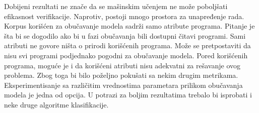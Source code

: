 \documentclass[12pt,oneside]{memoir}
\begin{document}
Dobijeni rezultati ne znače da se mašinskim učenjem ne može poboljšati efikasnost verifikacije. Naprotiv, postoji mnogo prostora za unapređenje rada. Korpus korišćen za obučavanje modela sadrži samo atribute programa. Pitanje je šta bi se dogodilo ako bi u fazi obučavanja bili dostupni čitavi programi. Sami atributi ne govore ništa o prirodi korišćenih programa. Može se pretpostaviti da nisu svi programi podjednako pogodni za obučavanje modela. Pored korišćenih programa, moguće je i da korišćeni atributi nisu adekvatni za rešavanje ovog problema. Zbog toga bi bilo poželjno pokušati sa nekim drugim metrikama. Eksperimentisanje sa različitim vrednostima parametara prilikom obučavanja modela je jedna od opcija. U potrazi za boljim rezultatima trebalo bi isprobati i neke druge algoritme klasifikacije. %










\literatura

\backmatter


%
\end{document}
